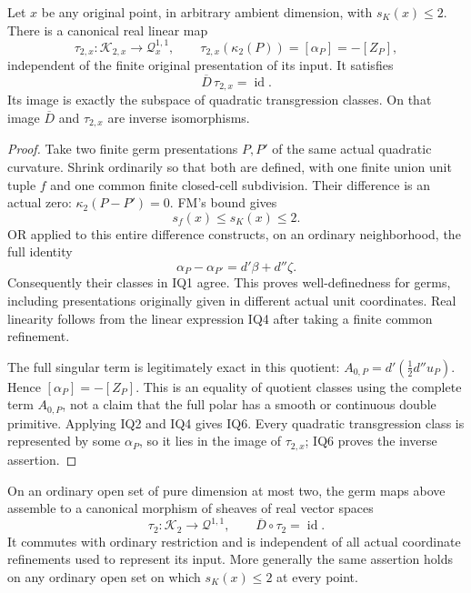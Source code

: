 \begin{theorem}
\label{thm:r11-intrinsic-quadratic-germ-class}
Let \(x\) be any original point, in arbitrary ambient dimension,
with \(s_K(x)\le2\).  There is a canonical real linear map
\[
 \tau_{2,x}:\mathscr K_{2,x}\longrightarrow\mathscr Q^{1,1}_x,
       \qquad
 \tau_{2,x}(\kappa_2(P))=[\alpha_P]=-[Z_P],
\tag{IQ5}
\]
independent of the finite original presentation of its input.
It satisfies
\[
                          \overline D\,\tau_{2,x}
                                      =\operatorname{id}.
\tag{IQ6}
\]
Its image is exactly the subspace of quadratic transgression
classes.  On that image \(\overline D\) and \(\tau_{2,x}\)
are inverse isomorphisms.
\end{theorem}

\begin{proof}
Take two finite germ presentations \(P,P'\) of the same actual
quadratic curvature.  Shrink ordinarily so that both are defined,
with one finite union unit tuple \(f\) and one common finite
closed-cell subdivision.  Their difference is an actual zero:
\(\kappa_2(P-P')=0\).  FM's bound gives
\[
                         s_f(x)\le s_K(x)\le2.
\tag{IQ7}
\]
OR applied to this entire difference constructs, on an ordinary
neighborhood, the full identity
\[
                  \alpha_P-\alpha_{P'}=d'\beta+d''\zeta.
\tag{IQ8}
\]
Consequently their classes in IQ1 agree.  This proves
well-definedness for germs, including presentations originally
given in different actual unit coordinates.  Real linearity
follows from the linear expression IQ4 after taking a finite
common refinement.

The full singular term is legitimately exact in this quotient:
\(A_{0,P}=d'(\tfrac12d''u_P)\).  Hence
\([\alpha_P]=-[Z_P]\).  This is an equality of quotient classes
using the complete term \(A_{0,P}\), not a claim that the full
polar has a smooth or continuous double primitive.  Applying
IQ2 and IQ4 gives IQ6.  Every quadratic transgression class is
represented by some \(\alpha_P\), so it lies in the image
of \(\tau_{2,x}\); IQ6 proves the inverse assertion.
\end{proof}

\begin{theorem}
\label{thm:r11-intrinsic-surface-transgression-sheaf}
On an ordinary open set of pure dimension at most two, the germ
maps above assemble to a canonical morphism of sheaves of real
vector spaces
\[
                   \tau_2:\mathscr K_2\longrightarrow
                                    \mathscr Q^{1,1},
              \qquad \overline D\circ\tau_2=\operatorname{id}.
\tag{IQ9}
\]
It commutes with ordinary restriction and is independent of all
actual coordinate refinements used to represent its input.  More
generally the same assertion holds on any ordinary open set on
which \(s_K(x)\le2\) at every point.
\end{theorem}

